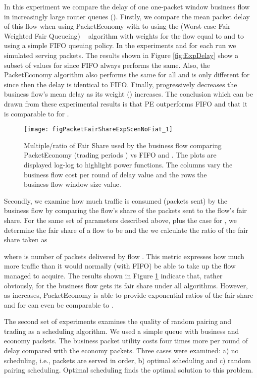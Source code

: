\documentclass[letterpaper,10pt]{llncs}
\newcommand{\hla}[1]{\hl{#1}}
\renewcommand{\hla}[1]{#1}
\begin{document}
In this experiment we compare the delay of one one-packet window business flow in increasingly large router queues (). Firstly, we compare the mean packet delay of this flow when using PacketEconomy with   to using the  (Worst-case Fair Weighted Fair Queueing) ~\cite{BZW2FQ} algorithm with weights for the flow equal to   and to using a simple FIFO queuing policy. In the experiments  and for each run we simulated serving  packets. The results shown in Figure \ref{fig:ExpDelay} show a subset of values for  since FIFO always performs the same. Also, the PacketEconomy algorithm also performs the same for all  and is only different for  since then the delay is identical to FIFO. Finally,  progressively decreases the business flow's mean delay as its weight () increases. The conclusion which can be drawn from these experimental results is that PE outperforms FIFO and that it is comparable to  for \hla{}.


\begin{figure}[h!]
\centering
\texttt{[image: figPacketFairShareExpScenNoFiat\_1]}
\caption{Multiple/ratio of Fair Share used by the business flow comparing PacketEconomy (trading periods ) vs FIFO and . The plots are displayed log-log to highlight power functions. The columns vary the business flow cost per round of delay  value and the rows the business flow window size  value.}
\label{fig:ExpFairShare}
\end{figure}


Secondly, we examine how much traffic is consumed (packets sent) by the business flow by comparing the flow's share of the packets sent to the flow's fair share. For the same set of parameters described above, plus the case for , we determine the fair share of a flow  to be  and the we calculate the ratio of the fair share taken as

where  is number of packets delivered by flow . This metric expresses how much more traffic than it would normally (with FIFO) be able to take up the flow managed to acquire. 
The results shown in Figure \ref{fig:ExpFairShare} indicate that, rather obviously, for  the business flow gets its fair share under all algorithms. However, as  increases, PacketEconomy is able to provide exponential ratios of the fair share and for \hla{} can even be comparable to .




The \hla{second} set of experiments examines the quality of random pairing and trading as a scheduling algorithm. We used a simple queue with business and economy packets. The business packet utility costs four times more per round of delay compared with the economy packets. Three cases were examined: a) no scheduling, i.e., packets are served in order, b) optimal scheduling and c) random pairing scheduling. Optimal scheduling finds the optimal solution to this problem. 
\end{document}
